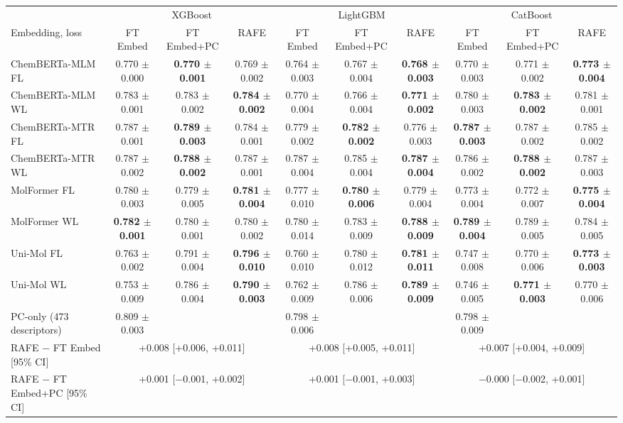 \begin{tabular}{@{}lccccccccc@{}}
\toprule
 & \multicolumn{3}{c}{XGBoost} & \multicolumn{3}{c}{LightGBM} & \multicolumn{3}{c}{CatBoost} \\
\cmidrule(lr){2-4} \cmidrule(lr){5-7} \cmidrule(lr){8-10}
Embedding, loss & FT Embed & FT Embed+PC & RAFE & FT Embed & FT Embed+PC & RAFE & FT Embed & FT Embed+PC & RAFE \\
\midrule
ChemBERTa-MLM FL & 0.770 $\pm$ 0.000 & \textbf{0.770 $\pm$ 0.001} & 0.769 $\pm$ 0.002 & 0.764 $\pm$ 0.003 & 0.767 $\pm$ 0.004 & \textbf{0.768 $\pm$ 0.003} & 0.770 $\pm$ 0.003 & 0.771 $\pm$ 0.002 & \textbf{0.773 $\pm$ 0.004} \\
ChemBERTa-MLM WL & 0.783 $\pm$ 0.001 & 0.783 $\pm$ 0.002 & \textbf{0.784 $\pm$ 0.002} & 0.770 $\pm$ 0.004 & 0.766 $\pm$ 0.004 & \textbf{0.771 $\pm$ 0.002} & 0.780 $\pm$ 0.003 & \textbf{0.783 $\pm$ 0.002} & 0.781 $\pm$ 0.001 \\
ChemBERTa-MTR FL & 0.787 $\pm$ 0.001 & \textbf{0.789 $\pm$ 0.003} & 0.784 $\pm$ 0.001 & 0.779 $\pm$ 0.002 & \textbf{0.782 $\pm$ 0.002} & 0.776 $\pm$ 0.003 & \textbf{0.787 $\pm$ 0.003} & 0.787 $\pm$ 0.002 & 0.785 $\pm$ 0.002 \\
ChemBERTa-MTR WL & 0.787 $\pm$ 0.002 & \textbf{0.788 $\pm$ 0.002} & 0.787 $\pm$ 0.001 & 0.787 $\pm$ 0.004 & 0.785 $\pm$ 0.004 & \textbf{0.787 $\pm$ 0.004} & 0.786 $\pm$ 0.002 & \textbf{0.788 $\pm$ 0.002} & 0.787 $\pm$ 0.003 \\
MolFormer FL & 0.780 $\pm$ 0.003 & 0.779 $\pm$ 0.005 & \textbf{0.781 $\pm$ 0.004} & 0.777 $\pm$ 0.010 & \textbf{0.780 $\pm$ 0.006} & 0.779 $\pm$ 0.004 & 0.773 $\pm$ 0.004 & 0.772 $\pm$ 0.007 & \textbf{0.775 $\pm$ 0.004} \\
MolFormer WL & \textbf{0.782 $\pm$ 0.001} & 0.780 $\pm$ 0.001 & 0.780 $\pm$ 0.002 & 0.780 $\pm$ 0.014 & 0.783 $\pm$ 0.009 & \textbf{0.788 $\pm$ 0.009} & \textbf{0.789 $\pm$ 0.004} & 0.789 $\pm$ 0.005 & 0.784 $\pm$ 0.005 \\
Uni-Mol FL & 0.763 $\pm$ 0.002 & 0.791 $\pm$ 0.004 & \textbf{0.796 $\pm$ 0.010} & 0.760 $\pm$ 0.010 & 0.780 $\pm$ 0.012 & \textbf{0.781 $\pm$ 0.011} & 0.747 $\pm$ 0.008 & 0.770 $\pm$ 0.006 & \textbf{0.773 $\pm$ 0.003} \\
Uni-Mol WL & 0.753 $\pm$ 0.009 & 0.786 $\pm$ 0.004 & \textbf{0.790 $\pm$ 0.003} & 0.762 $\pm$ 0.009 & 0.786 $\pm$ 0.006 & \textbf{0.789 $\pm$ 0.009} & 0.746 $\pm$ 0.005 & \textbf{0.771 $\pm$ 0.003} & 0.770 $\pm$ 0.006 \\
\midrule
PC-only (473 descriptors) & 0.809 $\pm$ 0.003 &  &  & 0.798 $\pm$ 0.006 &  &  & 0.798 $\pm$ 0.009 &  &  \\
RAFE $-$ FT Embed [95\% CI] & \multicolumn{3}{c}{+0.008 [+0.006, +0.011]} & \multicolumn{3}{c}{+0.008 [+0.005, +0.011]} & \multicolumn{3}{c}{+0.007 [+0.004, +0.009]} \\
RAFE $-$ FT Embed+PC [95\% CI] & \multicolumn{3}{c}{+0.001 [$-$0.001, +0.002]} & \multicolumn{3}{c}{+0.001 [$-$0.001, +0.003]} & \multicolumn{3}{c}{$-$0.000 [$-$0.002, +0.001]} \\
\bottomrule
\end{tabular}
